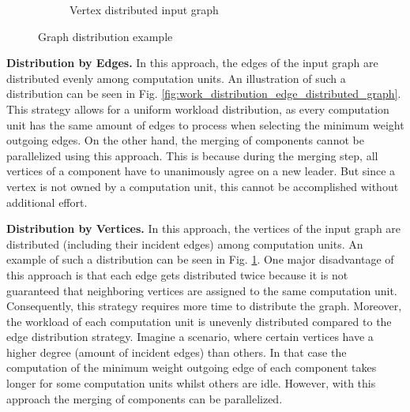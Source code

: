 \documentclass[letterpaper]{article}
\newcommand{\mypar}[1]{{\bf #1.}}
\begin{document}
\begin{figure}
\begin{subfigure}{0.33\textwidth}
    \caption{Vertex distributed input graph}
    \label{fig:work_distribution_vertex_distributed_graph}
  \end{subfigure}
  \caption{Graph distribution example}
  \label{fig:work_distribution}
\end{figure}

\mypar{Distribution by Edges}
In this approach, the edges of the input graph are distributed evenly among computation units. An illustration of such a
distribution can be seen in Fig. \ref{fig:work_distribution_edge_distributed_graph}. This strategy allows for a uniform
workload distribution, as every computation unit has the same amount of edges to process when selecting the minimum
weight outgoing edges. On the other hand, the merging of components cannot be parallelized using this approach. This is
because during the merging step, all vertices of a component have to unanimously agree on a new leader. But since a
vertex is not owned by a computation unit, this cannot be accomplished without additional effort.

\mypar{Distribution by Vertices}
In this approach, the vertices of the input graph are distributed (including their incident edges) among computation
units. An example of such a distribution can be seen in Fig. \ref{fig:work_distribution_vertex_distributed_graph}. One
major disadvantage of this approach is that each edge gets distributed twice because it is not guaranteed that
neighboring vertices are assigned to the same computation unit. Consequently, this strategy requires more time to
distribute the graph. Moreover, the workload of each computation unit is unevenly distributed compared to the edge
distribution strategy. Imagine a scenario, where certain vertices have a higher degree (amount of incident edges) than
others. In that case the computation of the minimum weight outgoing edge of each component takes longer for some
computation units whilst others are idle. However, with this approach the merging of components can be parallelized. 
\end{document}
